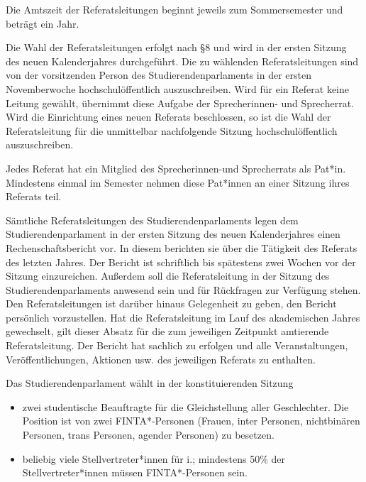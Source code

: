 \documentclass[10pt,a4paper]{scrartcl}
\begin{document}
\begin{contract}
Die Amtszeit der Referatsleitungen beginnt jeweils zum Sommersemester und
beträgt ein Jahr.

Die Wahl der Referatsleitungen erfolgt nach §8 und wird in der ersten Sitzung
des neuen Kalenderjahres durchgeführt. Die zu wählenden Referatsleitungen sind
von der vorsitzenden Person des Studierendenparlaments in der ersten
Novemberwoche hochschulöffentlich auszuschreiben. Wird für ein Referat keine
Leitung gewählt, übernimmt diese Aufgabe der Sprecherinnen- und Sprecherrat.
Wird die Einrichtung eines neuen Referats beschlossen, so ist die Wahl der
Referatsleitung für die unmittelbar nachfolgende Sitzung hochschulöffentlich
auszuschreiben.

Jedes Referat hat ein Mitglied des Sprecherinnen-und Sprecherrats
als Pat*in. Mindestens einmal im Semester nehmen diese Pat*innen an
einer Sitzung ihres Referats teil.

Sämtliche Referatsleitungen des Studierendenparlaments legen dem
Studierendenparlament in der ersten Sitzung des neuen Kalenderjahres einen
Rechenschaftsbericht vor. In diesem berichten sie über die Tätigkeit des
Referats des letzten Jahres. Der Bericht ist schriftlich bis spätestens zwei
Wochen vor der Sitzung einzureichen. Außerdem soll die Referatsleitung in der
Sitzung des Studierendenparlaments anwesend sein und für Rückfragen zur
Verfügung stehen. Den Referatsleitungen ist darüber hinaus Gelegenheit zu geben,
den Bericht persönlich vorzustellen. Hat die Referatsleitung im Lauf des
akademischen Jahres gewechselt, gilt dieser Absatz für die zum jeweiligen
Zeitpunkt amtierende Referatsleitung. Der Bericht hat sachlich zu erfolgen und
alle Veranstaltungen, Veröffentlichungen, Aktionen usw. des jeweiligen Referats
zu enthalten.
   
\label{beauftragte-fuer-die-gleichstellung-aller-geschlechter}

Das Studierendenparlament wählt in der konstituierenden Sitzung
\begin{itemize}
	\item zwei studentische Beauftragte für die Gleichstellung aller Geschlechter. Die Position ist von zwei FINTA*-Personen (Frauen, inter Personen, nichtbinären Personen, trans Personen, agender Personen) zu besetzen.
	\item beliebig viele Stellvertreter*innen für i.; mindestens 50\% der Stellvertreter*innen müssen FINTA*-Personen sein.
\end{itemize}


\end{contract}
\end{document}
